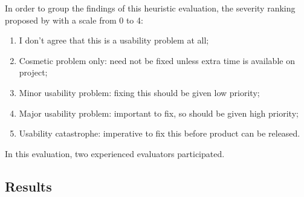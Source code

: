 \documentclass[a4paper]{article}
\begin{document}
In order to group the findings of this heuristic evaluation, the severity ranking proposed by \citet{nielsen1995rating} with a scale from 0 to 4:

\begin{enumerate}[start=0, label={\theenumi{} -}]
\item I don't agree that this is a usability problem at all;
\item Cosmetic problem only: need not be fixed unless extra time is available on project;
\item Minor usability problem: fixing this should be given low priority;
\item Major usability problem: important to fix, so should be given high priority;
\item Usability catastrophe: imperative to fix this before product can be released.
\end{enumerate}

In this evaluation, two experienced evaluators participated.

\subsection{Results}
\end{document}
